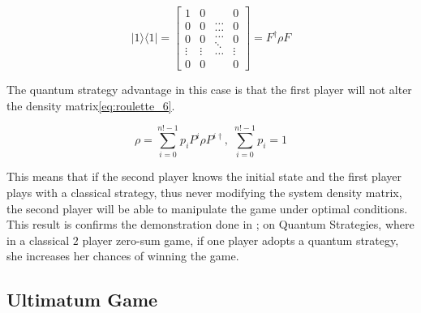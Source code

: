\begin{equation}
\label{eq:roulette_5}
\vert1\rangle\langle1\vert=\left[\begin{array}{c}
1\\
0\\
0\\
\vdots\\
0
\end{array}\begin{array}{c}
0\\
0\\
0\\
\vdots\\
0
\end{array}\begin{array}{c}
\ldots\\
\ldots\\
\ldots\\
\ddots\\
\ldots
\end{array}\begin{array}{c}
0\\
0\\
0\\
\vdots\\
0
\end{array}\right]=F^{\dagger}\rho F
\end{equation}


The quantum strategy advantage in this case is that the first player
will not alter the density matrix\eqref{eq:roulette_6}.

\begin{equation}
\label{eq:roulette_6}
\rho=\sum_{i=0}^{n!-1}p_{i}P^{i}\rho P^{i\dagger},\;\sum_{i=0}^{n!-1}p_{i}=1
\end{equation}

This means that if the second player knows the initial state and the first player plays with a classical strategy, thus never modifying the system density matrix, the second player will be able to manipulate the game under optimal conditions. This result is confirms the demonstration done in \cite{Meyer1999}; on Quantum Strategies, where in a classical $2$ player zero-sum game, if one player adopts a quantum strategy, she increases her chances of winning the game.

\clearpage


\subsection{Ultimatum Game}
\label{subsec:ultimatumquantum}





